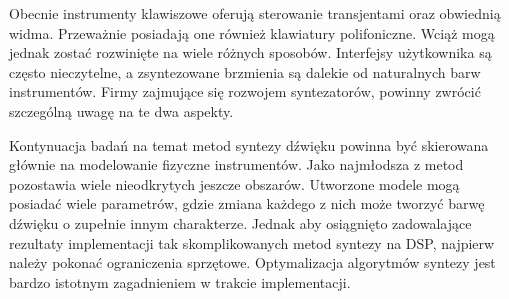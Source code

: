 Obecnie instrumenty klawiszowe oferują sterowanie transjentami oraz obwiednią widma. Przeważnie posiadają one również klawiatury polifoniczne. Wciąż mogą jednak zostać rozwinięte na wiele różnych sposobów. Interfejsy użytkownika są często nieczytelne, a zsyntezowane brzmienia są dalekie od naturalnych barw instrumentów. Firmy zajmujące się rozwojem syntezatorów, powinny zwrócić szczególną uwagę na te dwa aspekty.

Kontynuacja badań na temat metod syntezy dźwięku powinna być skierowana głównie na modelowanie fizyczne instrumentów. Jako najmłodsza z metod pozostawia wiele nieodkrytych jeszcze obszarów. Utworzone modele mogą posiadać wiele parametrów, gdzie zmiana każdego z nich może tworzyć barwę dźwięku o zupełnie innym charakterze. Jednak aby osiągnięto zadowalające rezultaty implementacji tak skomplikowanych metod syntezy na DSP, najpierw należy pokonać ograniczenia sprzętowe. Optymalizacja algorytmów syntezy jest bardzo istotnym zagadnieniem w trakcie implementacji.
